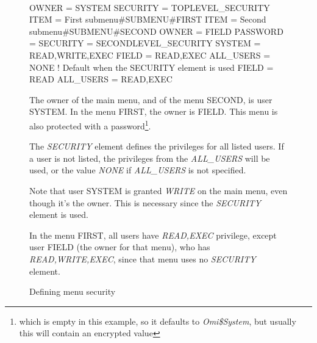 \documentclass[a4paper]{book}
\renewcommand{\indent}{\hspace*{5mm}}
\begin{document}
\begin{figure}[h!tb]
\begin{minipage}[h!tb]{\textwidth}
\hrulefill \\
\begin{ttfamily}
 \newline
\indent OWNER = SYSTEM \newline
\indent SECURITY = TOPLEVEL{\_}SECURITY \newline
\indent ITEM = First submenu{\#}SUBMENU{\#}FIRST \newline
\indent ITEM = Second submenu{\#}SUBMENU{\#}SECOND \newline
 \newline
{} \newline
\indent OWNER = FIELD \newline
\indent PASSWORD = \newline
 \newline
{} \newline
\indent SECURITY = SECONDLEVEL{\_}SECURITY \newline
 \newline
{} \newline
\indent SYSTEM = READ,WRITE,EXEC \newline
\indent FIELD = READ,EXEC \newline
\indent ALL{\_}USERS = NONE ! Default when the SECURITY element is used \newline
 \newline
{} \newline
\indent FIELD = READ \newline
\indent ALL{\_}USERS = READ,EXEC \newline
\end{ttfamily}
\noindent The owner of the main menu, and of the menu SECOND, is user SYSTEM. In the 
menu FIRST, the owner is FIELD. This menu is also protected with a 
password\footnote{ which is empty in this example, so it defaults to 
\textsl{Omi{\$}System}, but usually this will contain an encrypted value}.

The \textsl{SECURITY} element defines the 
privileges for all listed users. If a user is not listed, the privileges 
from the \textsl{ALL{\_}USERS} will be used, or the value 
\textsl{NONE} if \textsl{ALL{\_}USERS} is not specified.

Note that user SYSTEM is granted \textsl{WRITE} on the main menu, even though it's 
the owner. This is necessary since the \textsl{SECURITY} 
element is used.

In the menu FIRST, all users have \textsl{READ,EXEC} privilege, except user FIELD (the 
owner for that menu), who has \textsl{READ,WRITE,EXEC}, since that menu uses no 
\textsl{SECURITY} element.
\caption{Defining menu security}\label{fig:secexample}
\hrulefill
\end{minipage}
\end{figure}
\end{document}
